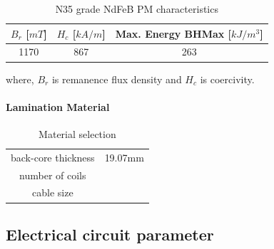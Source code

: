 \documentclass [a4 paper, 11pt, titlepage] {article}
\begin{document}
	\begin{table}[h]
		\begin{center}
			\begin{tabular}{c|c|c}
				$B_r$ [$mT$] & $H_c$ [$kA/m$] & Max. Energy BHMax [$kJ/m^3$] \\
				\hline
				1170 & 867 & 263
			\end{tabular}
		\end{center}
		\caption{N35 grade NdFeB PM characteristics}
		\label{tab:N35}
	\end{table}
	where, $B_r$ is remanence flux density and $H_c$ is coercivity.
	
	\paragraph{Lamination Material}
	
	
	\begin{table}[h]
		\begin{center}
			\begin{tabular}{c|c}
				 &  \\
				\hline
				back-core thickness & 19.07mm \\
				number of coils & \\
				cable size & 
			\end{tabular}
		\end{center}
		\caption{Material selection}
		\label{tab:materialSelection}
	\end{table}
	
	
	
	
	
	
	
	
	\subsection{Electrical circuit parameter}
	
	

	

	

	

	
	
	
	
\end{document}
